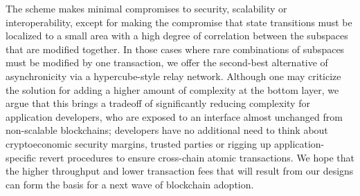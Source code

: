 \documentclass[11pt,a4paper]{article}
\theoremstyle{plain}
\theoremstyle{definition}
\theoremstyle{remark}
\begin{document}
The scheme makes minimal compromises to security, scalability or interoperability, except for making the compromise that state transitions must be localized to a small area with a high degree of correlation between the subspaces that are modified together. In those cases where rare combinations of subspaces must be modified by one transaction, we offer the second-best alternative of asynchronicity via a hypercube-style relay network. Although one may criticize the solution for adding a higher amount of complexity at the bottom layer, we argue that this brings a tradeoff of significantly reducing complexity for application developers, who are exposed to an interface almost unchanged from non-scalable blockchains; developers have no additional need to think about cryptoeconomic security margins, trusted parties or rigging up application-specific revert procedures to ensure cross-chain atomic transactions. We hope that the higher throughput and lower transaction fees that will result from our designs can form the basis for a next wave of blockchain adoption.
\end{document}
